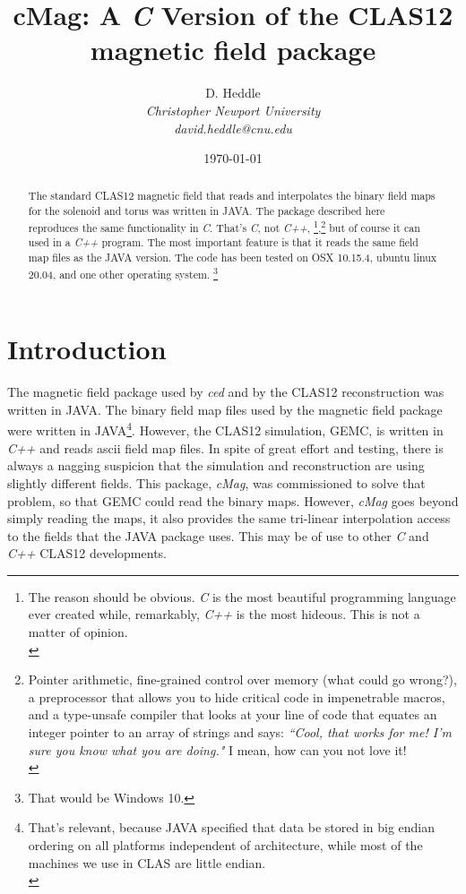\documentclass{article}
\title{\textbf{cMag:} A \emph{C} Version of the CLAS12 magnetic field package}
\author{D. Heddle  \\
	\emph{Christopher Newport University}  \\
         \emph{david.heddle@cnu.edu}\\
	}
\date{\today}
\begin{document}
\maketitle
\begin{abstract}
   The standard CLAS12 magnetic field that reads and interpolates the binary field maps for the solenoid and torus was written in JAVA. The package described here reproduces the same functionality in \emph{C}. That's  \emph{C}, not \emph{C++}, 
\footnote{The reason should be obvious. \emph{C} is the most beautiful programming language ever created while, remarkably, \emph{C++} is the most hideous. This is not a matter of opinion.\\},\footnote{Pointer arithmetic, fine-grained control over memory (what could go wrong?), a preprocessor that allows you to hide critical code in impenetrable macros, and a type-unsafe compiler that looks at your line of code that equates an integer pointer to an array of strings and says: \textit{``Cool, that works for me! I'm sure you know what you are doing."} I mean, how can you not love it!\\}
 but of course it can used in a \emph{C++} program. The most important feature is that it reads the same field map files as the JAVA version. The code has been tested on OSX 10.15.4, ubuntu linux 20.04, and one other operating system. \footnote[666]{That would be Windows 10.}


\end{abstract}
\newpage

\tableofcontents
\newpage

\section {Introduction}
The magnetic field package used by \textit{ced} and by the CLAS12 reconstruction was written in JAVA. The  binary field map files used by the magnetic field package were written in JAVA\footnote{That's relevant, because JAVA specified that data be stored in big endian ordering on all platforms independent of architecture, while most of the machines we use in CLAS are little endian.\\}. However, the CLAS12 simulation, GEMC, is written in \textit{C++} and reads ascii field map files. In spite of great effort and testing, there is always a nagging suspicion that the simulation and reconstruction are using slightly different fields. This package, \textit{cMag}, was commissioned to solve that problem, so that GEMC could read the binary maps. However, \textit{cMag} goes beyond simply reading the maps, it also provides the same tri-linear interpolation access to the fields that the JAVA package uses. This may be of use to other \textit{C} and \textit{C++} CLAS12 developments. 
\end{document}
